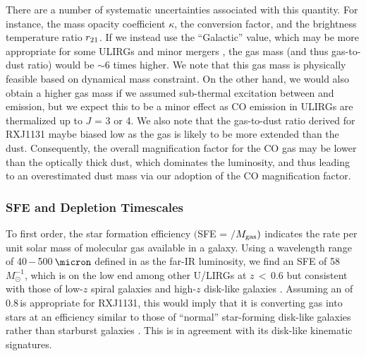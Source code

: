 \documentclass[]{emulateapj}
\begin{document}
There are a number of systematic uncertainties associated with this quantity. For instance,
the mass opacity coefficient $\kappa$,
the \alphaco conversion factor, and the brightness temperature ratio $r_{\rm 21}$.
If we instead use the ``Galactic'' \alphaco value, which may be more appropriate for some ULIRGs \citep[\eg][]{Papadopoulos12a} and minor mergers \citep{Narayanan12a},
the gas mass (and thus gas-to-dust ratio) would be $\sim$6 times higher.
We note that this gas mass is physically feasible based on dynamical mass constraint. 
On the other hand, we would also obtain a higher gas mass if
we assumed sub-thermal excitation between \bco and \aco emission, but
we expect this to be a minor effect as CO emission in ULIRGs are thermalized up to $J$ = 3 or 4.
We also note that the gas-to-dust ratio derived for RXJ1131 maybe biased low as the gas is likely to
be more extended than the dust. Consequently, the overall magnification factor 
for the CO gas may be lower than the optically thick dust, which dominates the \fir
luminosity, and thus leading to an overestimated dust mass 
via our adoption of the CO magnification factor. 

\subsubsection{SFE and Depletion Timescales}


To first order, the star formation efficiency
$($SFE = \LFIR$/$$M_{\rm gas})$ indicates the \SF rate per unit solar mass of molecular gas available in a galaxy.
Using a wavelength range of 40\,$-$\,500\,$\micron$ defined
in  as the far-IR luminosity,
we find an SFE of 58 \Lsun $M_{\odot}^{-1}$,
which is on the low end among other U/LIRGs at $z$\,$<$\,0.6
\citep[;][]{Combes11a} but consistent with those of
low-$z$ spiral galaxies  and high-$z$ disk-like galaxies \citep{Daddi08a}.
Assuming an \alphaco of 0.8\,\alphaU is appropriate for RXJ1131, this would imply that
it is converting gas into stars at an efficiency 
similar to those of ``normal'' star-forming
disk-like galaxies rather than starburst galaxies
\citep[][]{Tacconi08a, Riechers11a}. 
This is in agreement with its disk-like kinematic signatures.
\end{document}
